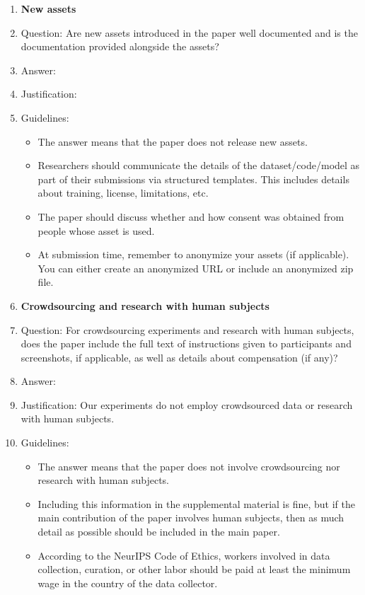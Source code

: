 \begin{enumerate}
\item {\bf New assets}
    \item[] Question: Are new assets introduced in the paper well documented and is the documentation provided alongside the assets?
    \item[] Answer: \answerTODO{} %
    \item[] Justification: \justificationTODO{}
    \item[] Guidelines:
    \begin{itemize}
        \item The answer \answerNA{} means that the paper does not release new assets.
        \item Researchers should communicate the details of the dataset\slash code\slash model as part of their submissions via structured templates. This includes details about training, license, limitations, etc. 
        \item The paper should discuss whether and how consent was obtained from people whose asset is used.
        \item At submission time, remember to anonymize your assets (if applicable). You can either create an anonymized URL or include an anonymized zip file.
    \end{itemize}

\item {\bf Crowdsourcing and research with human subjects}
    \item[] Question: For crowdsourcing experiments and research with human subjects, does the paper include the full text of instructions given to participants and screenshots, if applicable, as well as details about compensation (if any)? 
    \item[] Answer: \answerNA{} %
    \item[] Justification: Our experiments do not employ crowdsourced data or research with human subjects.
    \item[] Guidelines:
    \begin{itemize}
        \item The answer \answerNA{} means that the paper does not involve crowdsourcing nor research with human subjects.
        \item Including this information in the supplemental material is fine, but if the main contribution of the paper involves human subjects, then as much detail as possible should be included in the main paper. 
        \item According to the NeurIPS Code of Ethics, workers involved in data collection, curation, or other labor should be paid at least the minimum wage in the country of the data collector. 
    \end{itemize}


\end{enumerate}
